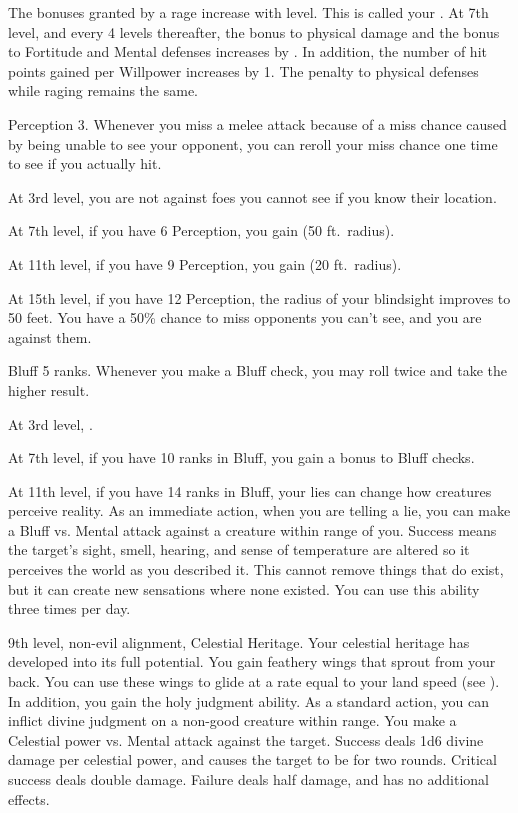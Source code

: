     The bonuses granted by a rage increase with level.
    This is called your .
    At 7th level, and every 4 levels thereafter, the bonus to physical damage and the bonus to Fortitude and Mental defenses increases by .
    In addition, the number of hit points gained per Willpower increases by 1.
    The penalty to physical defenses while raging remains the same.

    \featpre Perception 3.
    \featben Whenever you miss a melee attack because of a miss chance caused by being unable to see your opponent, you can reroll your miss chance one time to see if you actually hit.

    At 3rd level, you are not  against foes you cannot see if you know their location.

    At 7th level, if you have 6 Perception, you gain  (50 ft.\ radius).

    At 11th level, if you have 9 Perception, you gain  (20 ft.\ radius).

    At 15th level, if you have 12 Perception, the radius of your blindsight improves to 50 feet.
     You have a 50\% chance to miss opponents you can't see, and you are  against them.

    \featpre Bluff 5 ranks.
    \featben Whenever you make a Bluff check, you may roll twice and take the higher result.

    At 3rd level, \tdash.

    At 7th level, if you have 10 ranks in Bluff, you gain a  bonus to Bluff checks.

    At 11th level, if you have 14 ranks in Bluff, your lies can change how creatures perceive reality.
    As an immediate action, when you are telling a lie, you can make a Bluff vs. Mental attack against a creature within \rngmed range of you.
    Success means the target's sight, smell, hearing, and sense of temperature are altered so it perceives the world as you described it.
    This cannot remove things that do exist, but it can create new sensations where none existed.
    You can use this ability three times per day.

    \featpres 9th level, non-evil alignment, Celestial Heritage.
    \featben Your celestial heritage has developed into its full potential.
    You gain feathery wings that sprout from your back.
    You can use these wings to glide at a rate equal to your land speed (see ).
    In addition, you gain the holy judgment ability.
     As a standard action, you can inflict divine judgment on a non-good creature within \rnglong range. You make a Celestial power vs. Mental attack against the target. Success deals 1d6 divine damage per celestial power, and causes the target to be \dazed for two rounds. Critical success deals double damage. Failure deals half damage, and has no additional effects.

